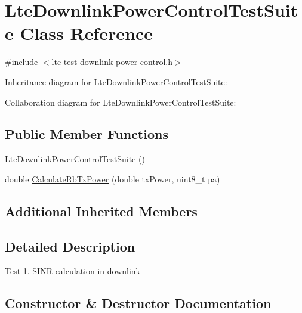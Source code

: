 \hypertarget{classLteDownlinkPowerControlTestSuite}{}\section{Lte\+Downlink\+Power\+Control\+Test\+Suite Class Reference}
\label{classLteDownlinkPowerControlTestSuite}


{\ttfamily \#include $<$lte-\/test-\/downlink-\/power-\/control.\+h$>$}



Inheritance diagram for Lte\+Downlink\+Power\+Control\+Test\+Suite\+:


Collaboration diagram for Lte\+Downlink\+Power\+Control\+Test\+Suite\+:
\subsection*{Public Member Functions}
\begin{DoxyCompactItemize}
\item 
\hyperlink{classLteDownlinkPowerControlTestSuite_af76a41af80a3946cf72e5d9688920ac0}{Lte\+Downlink\+Power\+Control\+Test\+Suite} ()
\item 
double \hyperlink{classLteDownlinkPowerControlTestSuite_acbda226a1db61d5328141d80aca96447}{Calculate\+Rb\+Tx\+Power} (double tx\+Power, uint8\+\_\+t pa)
\end{DoxyCompactItemize}
\subsection*{Additional Inherited Members}


\subsection{Detailed Description}
Test 1. S\+I\+NR calculation in downlink 

\subsection{Constructor \& Destructor Documentation}
